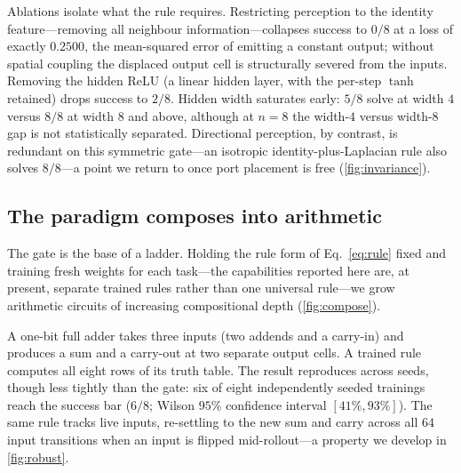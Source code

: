 Ablations isolate what the rule requires. Restricting perception to the identity feature---removing all neighbour information---collapses success to $0/8$ at a loss of exactly $0.2500$, the mean-squared error of emitting a constant output; without spatial coupling the displaced output cell is structurally severed from the inputs. Removing the hidden ReLU (a linear hidden layer, with the per-step $\tanh$ retained) drops success to $2/8$. Hidden width saturates early: $5/8$ solve at width $4$ versus $8/8$ at width $8$ and above, although at $n=8$ the width-$4$ versus width-$8$ gap is not statistically separated. Directional perception, by contrast, is redundant on this symmetric gate---an isotropic identity-plus-Laplacian rule also solves $8/8$---a point we return to once port placement is free (\ref{fig:invariance}).

\subsection{The paradigm composes into arithmetic}

The gate is the base of a ladder. Holding the rule form of Eq.~\eqref{eq:rule} fixed and training fresh weights for each task---the capabilities reported here are, at present, separate trained rules rather than one universal rule---we grow arithmetic circuits of increasing compositional depth (\ref{fig:compose}).

A one-bit full adder takes three inputs (two addends and a carry-in) and produces a sum and a carry-out at two separate output cells. A trained rule computes all eight rows of its truth table. The result reproduces across seeds, though less tightly than the gate: six of eight independently seeded trainings reach the success bar ($6/8$; Wilson $95\%$ confidence interval $[41\%, 93\%]$). The same rule tracks live inputs, re-settling to the new sum and carry across all $64$ input transitions when an input is flipped mid-rollout---a property we develop in \ref{fig:robust}.

